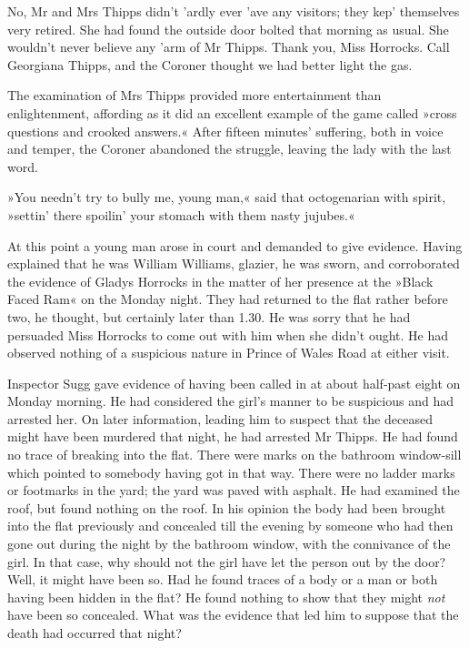 No, Mr and Mrs Thipps didn't 'ardly ever 'ave any visitors; they kep' themselves very retired. She had found the outside door bolted that morning as usual. She wouldn't never believe any 'arm of Mr Thipps. Thank you, Miss Horrocks. Call Georgiana Thipps, and the Coroner thought we had better light the gas.

The examination of Mrs Thipps provided more entertainment than enlightenment, affording as it did an excellent example of the game called »cross questions and crooked answers.« After fifteen minutes' suffering, both in voice and temper, the Coroner abandoned the struggle, leaving the lady with the last word.

»You needn't try to bully me, young man,« said that octogenarian with spirit, »settin' there spoilin' your stomach with them nasty jujubes.«

At this point a young man arose in court and demanded to give evidence. Having explained that he was William Williams, glazier, he was sworn, and corroborated the evidence of Gladys Horrocks in the matter of her presence at the »Black Faced Ram« on the Monday night. They had returned to the flat rather before two, he thought, but certainly later than 1.30. He was sorry that he had persuaded Miss Horrocks to come out with him when she didn't ought. He had observed nothing of a suspicious nature in Prince of Wales Road at either visit.

Inspector Sugg gave evidence of having been called in at about half-past eight on Monday morning. He had considered the girl's manner to be suspicious and had arrested her. On later information, leading him to suspect that the deceased might have been murdered that night, he had arrested Mr Thipps. He had found no trace of breaking into the flat. There were marks on the bathroom window-sill which pointed to somebody having got in that way. There were no ladder marks or footmarks in the yard; the yard was paved with asphalt. He had examined the roof, but found nothing on the roof. In his opinion the body had been brought into the flat previously and concealed till the evening by someone who had then gone out during the night by the bathroom window, with the connivance of the girl. In that case, why should not the girl have let the person out by the door? Well, it might have been so. Had he found traces of a body or a man or both having been hidden in the flat? He found nothing to show that they might \textit{not} have been so concealed. What was the evidence that led him to suppose that the death had occurred that night?

